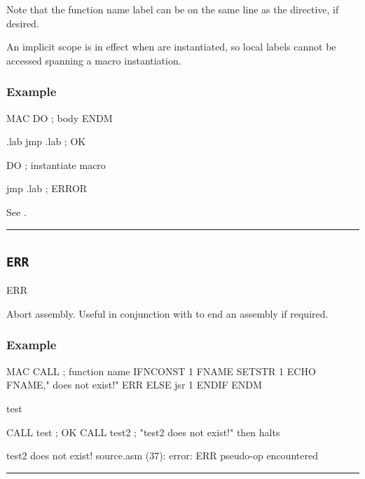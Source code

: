 Note that the function name label can be on the same line as the directive, if desired.

An implicit  scope is in effect when  are instantiated, so local labels cannot be accessed spanning a macro instantiation.\\

\subsubsection{Example}

\begin{code}
  MAC DO
  ; body
  ENDM

.lab
  jmp .lab     ; OK
  
  DO  ; instantiate macro
  
  jmp .lab     ; ERROR
\end{code}

See .


\hrule
\subsection{\texttt{ERR}}
\label{pseudoop:err}

\begin{usage}
  ERR
\end{usage}

Abort assembly. Useful in conjunction with  to end an assembly if required.

\subsubsection{Example}

\begin{code}
  MAC CALL ; function name
    IFNCONST {1}
FNAME SETSTR {1}
      ECHO FNAME," does not exist!"
      ERR
    ELSE
      jsr {1}
    ENDIF
  ENDM

test

  CALL test         ; OK
  CALL test2        ; "test2 does not exist!" then halts
\end{code}

\begin{outputx}
test2 does not exist!
source.asm (37): error: ERR pseudo-op encountered
\end{outputx}

\hrule



